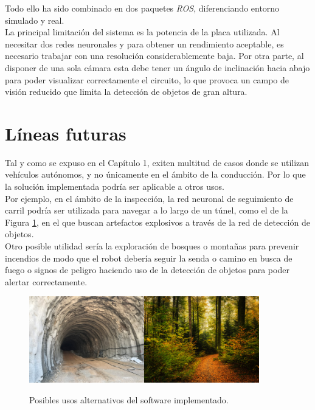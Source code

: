 Todo ello ha sido combinado en dos paquetes \textit{ROS}, diferenciando entorno simulado y real.\\

La principal limitación del sistema es la potencia de la placa utilizada. Al necesitar dos redes neuronales y para obtener un rendimiento aceptable, es necesario trabajar con una resolución considerablemente baja. Por otra parte, al disponer de una sola cámara esta debe tener un ángulo de inclinación hacia abajo para poder visualizar correctamente el circuito, lo que provoca un campo de visión reducido que limita la detección de objetos de gran altura.\\

\section{Líneas futuras}
\label{section:future}
Tal y como se expuso en el Capítulo 1, exiten multitud de casos donde se utilizan vehículos autónomos, y no únicamente en el ámbito de la conducción. Por lo que la solución implementada podría ser aplicable a otros usos.\\ 

Por ejemplo, en el ámbito de la inspección, la red neuronal de seguimiento de carril podría ser utilizada para navegar a lo largo de un túnel, como el de la Figura \ref{fig:moreusages}, en el que buscan artefactos explosivos a través de la red de detección de objetos.\\

Otro posible utilidad sería la exploración de bosques o montañas para prevenir incendios de modo que el robot debería seguir la senda o camino en busca de fuego o signos de peligro haciendo uso de la detección de objetos para poder alertar correctamente.\\

\begin{figure} [h!]
	\begin{center}
		\includegraphics[width=5cm]{figs/tunel}\hspace{0.5cm}\includegraphics[width=5cm]{figs/forest}
	\end{center}
	\caption{Posibles usos alternativos del software implementado.}
	\label{fig:moreusages}
\end{figure}\

